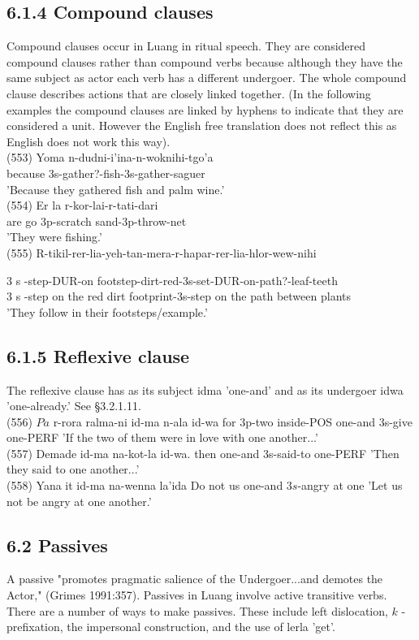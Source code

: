 \documentclass[10pt]{article}
\begin{document}
\subsection*{6.1.4 Compound clauses}
Compound clauses occur in Luang in ritual speech. They are considered compound clauses rather than compound verbs because although they have the same subject as actor each verb has a different undergoer. The whole compound clause describes actions that are closely linked together. (In the following examples the compound clauses are linked by hyphens to indicate that they are considered a unit. However the English free translation does not reflect this as English does not work this way).\\
(553) Yoma n-dudni-i'ina-n-woknihi-tgo'a\\
because 3s-gather?-fish-3s-gather-saguer\\
'Because they gathered fish and palm wine.'\\
(554) Er la r-kor-lai-r-tati-dari\\
are go 3p-scratch sand-3p-throw-net\\
'They were fishing.'\\
(555) R-tikil-rer-lia-yeh-tan-mera-r-hapar-rer-lia-hlor-wew-nihi

3 s -step-DUR-on footstep-dirt-red-3s-set-DUR-on-path?-leaf-teeth\\
3 s -step on the red dirt footprint-3s-step on the path between plants\\
'They follow in their footsteps/example.'

\subsection*{6.1.5 Reflexive clause}
The reflexive clause has as its subject idma 'one-and' and as its undergoer idwa 'one-already.' See §3.2.1.11.\\
(556) \(P a\) r-rora ralma-ni id-ma n-ala id-wa for 3p-two inside-POS one-and 3s-give one-PERF 'If the two of them were in love with one another...'\\
(557) Demade id-ma na-kot-la id-wa. then one-and 3s-said-to one-PERF 'Then they said to one another...'\\
(558) Yana it id-ma na-wenna la'ida Do not us one-and \(3 s\)-angry at one 'Let us not be angry at one another.'

\subsection*{6.2 Passives}
A passive "promotes pragmatic salience of the Undergoer...and demotes the Actor," (Grimes 1991:357). Passives in Luang involve active transitive verbs. There are a number of ways to make passives. These include left dislocation, \(k\) - prefixation, the impersonal construction, and the use of lerla 'get'.
\end{document}
